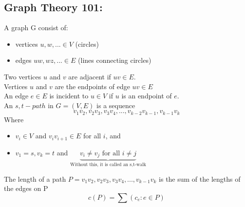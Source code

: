 \documentclass[letterpaper, 12pt]{article}
\begin{document}
    \subsection{Graph Theory 101:}
    A graph G consist of:
    \begin{itemize}
        \item vertices $u,w,...\in V$ (circles)
        \item edges $uw,wz,...\in E$ (lines connecting circles)
    \end{itemize}
    Two vertices $u$ and $v$ are adjacent if $uv \in E$.\\
    Vertices $u$ and $v$ are the endpoints of edge $uv \in E$\\
    An edge $e \in E$ is incident to $u \in V$ if $u$ is an endpoint of $e$.\\
    \bigskip
    An $s,t-path$ in $G = (V,E)$ is a sequence
    $$v_1v_2,v_2v_3,v_3v_4,...,v_{k-2}v_{k-1},v_{k-1}v_k$$
    Where\\
    \begin{itemize}
        \item $v_i \in V$ and $v_iv_{i+1} \in E$ for all $i$, and
        \item $v_1 = s, v_k = t$ and $\underbrace{v_i \neq v_j \text{ for all } i \neq j}_{\text{Without this, it is called an s,t-walk}}$
    \end{itemize}
    The length of a path $P = v_1v_2,v_2v_3,v_3v_4,...,v_{k-1}v_k$ is the sum of the lengths of the edges on P
    $$c(P) = \sum(c_e:e \in P)$$
    
\end{document}

